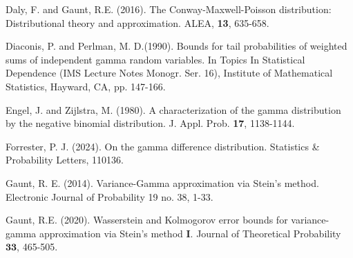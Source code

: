 \documentclass[12pt, a4paper,reqno]{amsart}
\theoremstyle{definition}
\theoremstyle{myremark}
\numberwithin{equation}{section}
\begin{document}
\begin{thebibliography}{}
	
		
	
	
	 Daly, F. and Gaunt, R.E. (2016). The Conway-Maxwell-Poisson distribution: Distributional theory and approximation. ALEA, \textbf{13}, 635-658.
	
 Diaconis, P. and Perlman, M. D.(1990). Bounds for tail probabilities of weighted sums of independent gamma random variables. In Topics In Statistical Dependence (IMS Lecture Notes Monogr. Ser. 16), Institute of Mathematical Statistics, Hayward, CA, pp. 147-166.	
	
%	
	
 Engel, J. and Zijlstra, M. (1980). A characterization of the gamma distribution by the negative binomial distribution.
J. Appl. Prob. \textbf{17}, 1138-1144.	
	
	Forrester, P. J. (2024). On the gamma difference distribution. Statistics \& Probability Letters, 110136.
	
	
	Gaunt, R. E. (2014). Variance-Gamma approximation via Stein’s method. Electronic Journal of Probability 19 no. 38, 1-33.

	Gaunt, R.E. (2020). Wasserstein and Kolmogorov error bounds for variance-gamma approximation via Stein’s method $\textbf{I}$. Journal of Theoretical Probability $\mathbf{33}$, 465-505.
	

\end{thebibliography}
\end{document}
